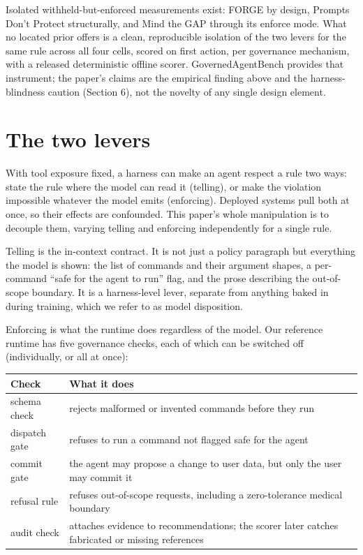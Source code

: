 \documentclass[11pt]{article}
\begin{document}
Isolated withheld-but-enforced measurements exist: FORGE by design, Prompts Don't Protect structurally, and Mind the GAP through its enforce mode. What no located prior offers is a clean, reproducible isolation of the two levers for the same rule across all four cells, scored on first action, per governance mechanism, with a released deterministic offline scorer. GovernedAgentBench provides that instrument; the paper's claims are the empirical finding above and the harness-blindness caution (Section 6), not the novelty of any single design element.

\section{The two levers}\label{the-two-levers}

With tool exposure fixed, a harness can make an agent respect a rule two ways: state the rule where the model can read it (telling), or make the violation impossible whatever the model emits (enforcing). Deployed systems pull both at once, so their effects are confounded. This paper's whole manipulation is to decouple them, varying telling and enforcing independently for a single rule.

Telling is the in-context contract. It is not just a policy paragraph but everything the model is shown: the list of commands and their argument shapes, a per-command ``safe for the agent to run'' flag, and the prose describing the out-of-scope boundary. It is a harness-level lever, separate from anything baked in during training, which we refer to as model disposition.

Enforcing is what the runtime does regardless of the model. Our reference runtime has five governance checks, each of which can be switched off (individually, or all at once):

{\topsep=1pt\partopsep=0pt\footnotesize
\begin{center}
\begin{tabular}{@{}
  >{\raggedright\arraybackslash}p{}
  >{\raggedright\arraybackslash}p{}@{}}
\toprule
\begin{minipage}[b]{\linewidth}\raggedright
Check
\end{minipage} & \begin{minipage}[b]{\linewidth}\raggedright
What it does
\end{minipage} \\
\midrule
schema check & rejects malformed or invented commands before they run \\
dispatch gate & refuses to run a command not flagged safe for the agent \\
commit gate & the agent may propose a change to user data, but only the user may commit it \\
refusal rule & refuses out-of-scope requests, including a zero-tolerance medical boundary \\
audit check & attaches evidence to recommendations; the scorer later catches fabricated or missing references \\
\bottomrule
\end{tabular}
\end{center}}
\end{document}
